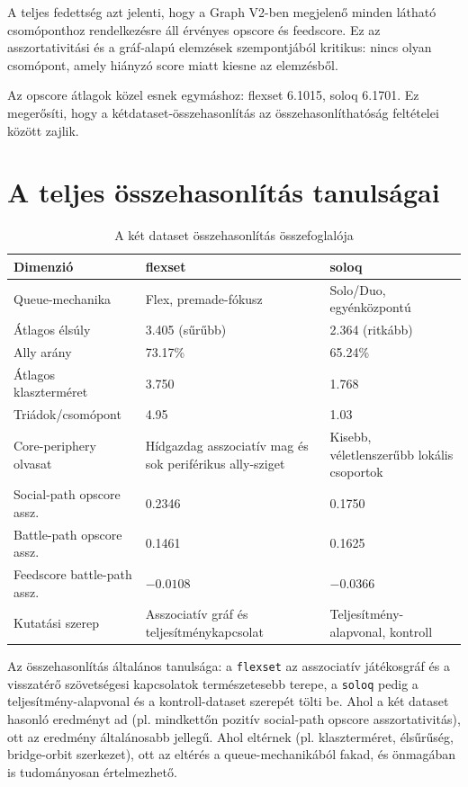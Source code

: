﻿\documentclass[a4paper,12pt]{report}
\begin{document}
A teljes fedettség azt jelenti, hogy a Graph V2-ben megjelenő minden látható csomóponthoz rendelkezésre áll érvényes opscore és feedscore. Ez az asszortativitási és a gráf-alapú elemzések szempontjából kritikus: nincs olyan csomópont, amely hiányzó score miatt kiesne az elemzésből.

Az opscore átlagok közel esnek egymáshoz: flexset 6.1015, soloq 6.1701. Ez megerősíti, hogy a kétdataset-összehasonlítás az összehasonlíthatóság feltételei között zajlik.

\section{A teljes összehasonlítás tanulságai}

\begin{table}[H]
\centering
\caption{A két dataset összehasonlítás összefoglalója}
\begin{tabularx}{\textwidth}{>{\raggedright\arraybackslash}p{5cm} X X}
\toprule
\textbf{Dimenzió} & \textbf{flexset} & \textbf{soloq} \\
\midrule
Queue-mechanika & Flex, premade-fókusz & Solo/Duo, egyénközpontú \\
Átlagos élsúly & 3.405 (sűrűbb) & 2.364 (ritkább) \\
Ally arány & 73.17\% & 65.24\% \\
Átlagos klaszterméret & 3.750 & 1.768 \\
Triádok/csomópont & 4.95 & 1.03 \\
Core-periphery olvasat & Hídgazdag asszociatív mag és sok periférikus ally-sziget & Kisebb, véletlenszerűbb lokális csoportok \\
Social-path opscore assz. & 0.2346 & 0.1750 \\
Battle-path opscore assz. & 0.1461 & 0.1625 \\
Feedscore battle-path assz. & $-0.0108$ & $-0.0366$ \\
Kutatási szerep & Asszociatív gráf és teljesítménykapcsolat & Teljesítmény-alapvonal, kontroll \\
\bottomrule
\end{tabularx}
\end{table}

Az összehasonlítás általános tanulsága: a \texttt{flexset} az asszociatív játékosgráf és a visszatérő szövetségesi kapcsolatok természetesebb terepe, a \texttt{soloq} pedig a teljesítmény-alapvonal és a kontroll-dataset szerepét tölti be. Ahol a két dataset hasonló eredményt ad (pl. mindkettőn pozitív social-path opscore asszortativitás), ott az eredmény általánosabb jellegű. Ahol eltérnek (pl. klaszterméret, élsűrűség, bridge-orbit szerkezet), ott az eltérés a queue-mechanikából fakad, és önmagában is tudományosan értelmezhető.
\end{document}
